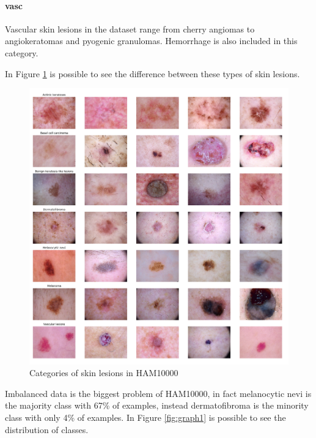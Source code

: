 	\paragraph{vasc}
	Vascular skin lesions in the dataset range from cherry angiomas to angiokeratomas and pyogenic granulomas. Hemorrhage is also included in this category.
	
	\bigskip
	
	In Figure \ref{fig:category_samples} is possible to see the difference between these types of skin lesions.
	
	\begin{figure}[H]
		\centering
		\includegraphics[width=15cm]{images/category_samples.png}
		\caption{Categories of skin lesions in HAM10000}
		\label{fig:category_samples}
	\end{figure}
	
	Imbalanced data is the biggest problem of HAM10000, in fact melanocytic nevi is the majority class with 67\% of examples, instead dermatofibroma is the minority class with only 4\% of examples. In Figure \ref{fig:graph1} is possible to see the distribution of classes. 
	
	\smallskip
	
